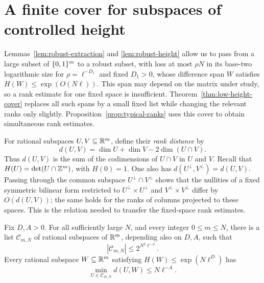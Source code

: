 \section{A finite cover for subspaces of controlled height}\label{sec:low-height}

Lemmas~\ref{lem:robust-extraction} and \ref{lem:robust-height} allow us
to pass from a large subset of \(\{0,1\}^m\) to a robust subset, with loss
at most \(\rho N\) in its base-two logarithmic size for
\(\rho=\ell^{-D_1}\) and fixed \(D_1>0\), whose difference span \(W\)
satisfies \(H(W)\le \exp(O(N\ell))\). This span may depend on the matrix
under study, so a rank estimate for one fixed space is insufficient.
Theorem~\ref{thm:low-height-cover} replaces all such spans by a small
fixed list while changing the relevant ranks only slightly.
Proposition~\ref{prop:typical-ranks} uses this cover to obtain simultaneous
rank estimates.

For rational subspaces \(U,V\subseteq\mathbb R^m\), define their \emph{rank
distance} by
\[
 d(U,V)=\dim U+\dim V-2\dim(U\cap V).
\]
Thus \(d(U,V)\) is the sum of the codimensions of \(U\cap V\) in \(U\)
and \(V\). Recall that \(H(U)=\det(U\cap\mathbb Z^m)\), with \(H(0)=1\).
One also has \(d(U^\perp,V^\perp)=d(U,V)\). Passing through the common
subspace \(U^\perp\cap V^\perp\) shows that the nullities of a fixed
symmetric bilinear form restricted to \(U^\perp\times U^\perp\) and
\(V^\perp\times V^\perp\) differ by \(O(d(U,V))\); the same holds for
the ranks of columns projected to these spaces. This is the relation
needed to transfer the fixed-space rank estimates.

\begin{theorem}\label{thm:low-height-cover}
Fix \(D,A>0\). For all sufficiently large \(N\), and every integer
\(0\le m\le N\), there is a list \(\mathcal C_{m,N}\) of rational subspaces of
\(\mathbb R^m\), depending also on \(D,A\), such that
\[
 |\mathcal C_{m,N}|\le 2^{N^2\ell^{-A}}.
\]
Every rational subspace \(W\subseteq\mathbb R^m\) satisfying
\(H(W)\le\exp(N\ell^D)\) has
\[
 \min_{U\in\mathcal C_{m,N}}d(U,W)\le N\ell^{-A}.
\]
\end{theorem}

